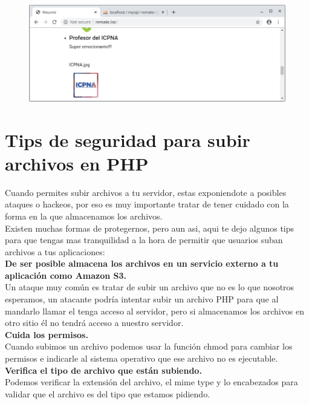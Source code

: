\documentclass{article}
\begin{document}
\begin{figure}[h!]
  \centering
  \includegraphics[scale=0.5]{./Pictures/192_index_twig_ok.png}
\end{figure}


\newpage

\section{Tips de seguridad para subir archivos en PHP}%
Cuando permites subir archivos a tu servidor, estas exponiendote a posibles
ataques o hackeos, por eso es muy importante tratar de tener cuidado con la
forma en la que almacenamos los archivos.\\

Existen muchas formas de protegernos, pero aun asi, aqui te dejo algunos tips
para que tengas mas tranquilidad a la hora de permitir que usuarios suban
archivos a tus aplicaciones:\\

\textbf{De ser posible almacena los archivos en un servicio externo a tu
aplicación como Amazon S3.}\\
Un ataque muy común es tratar de subir un archivo que no es lo que nosotros
esperamos, un atacante podría intentar subir un archivo PHP para que al
mandarlo llamar el tenga acceso al servidor, pero si almacenamos los archivos
en otro sitio él no tendrá acceso a nuestro servidor.\\

\textbf{Cuida los permisos.}\\
Cuando subimos un archivo podemos usar la función chmod para cambiar los
permisos e indicarle al sistema operativo que ese archivo no es ejecutable.\\

\textbf{Verifica el tipo de archivo que están subiendo.}\\
Podemos verificar la extensión del archivo, el mime type y lo encabezados para
validar que el archivo es del tipo que estamos pidiendo.\\
\end{document}

